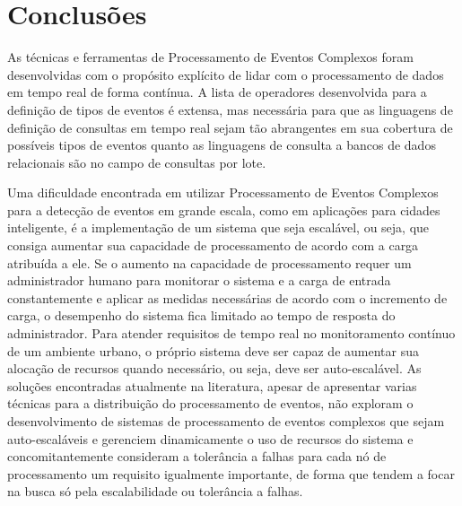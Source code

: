\chapter{Conclusões}
\label{cap:conclusoes}



As técnicas e ferramentas de Processamento de Eventos Complexos foram desenvolvidas com o propósito explícito de lidar com o processamento de dados em tempo real de forma contínua. A lista de operadores desenvolvida para a definição de tipos de eventos é extensa, mas necessária para que as linguagens de definição de consultas em tempo real sejam tão abrangentes em sua cobertura de possíveis tipos de eventos quanto as linguagens de consulta a bancos de dados relacionais são no campo de consultas por lote.

Uma dificuldade encontrada em utilizar Processamento de Eventos Complexos para a detecção de eventos em grande escala, como em aplicações para cidades inteligente, é a implementação de um sistema que seja escalável, ou seja, que consiga aumentar sua capacidade de processamento de acordo com a carga atribuída a ele. Se o aumento na capacidade de processamento requer um administrador humano para monitorar o sistema e a carga de entrada constantemente e aplicar as medidas necessárias de acordo com o incremento de carga, o desempenho do sistema fica limitado ao tempo de resposta do administrador. Para atender requisitos de tempo real no monitoramento contínuo de um ambiente urbano, o próprio sistema deve ser capaz de aumentar sua alocação de recursos quando necessário, ou seja, deve ser auto-escalável. As soluções encontradas atualmente na literatura, apesar de apresentar varias técnicas para a distribuição do processamento de eventos, não exploram o desenvolvimento de sistemas de processamento de eventos complexos que sejam auto-escaláveis e gerenciem dinamicamente o uso de recursos do sistema e concomitantemente consideram a tolerância a falhas para cada nó de processamento um requisito igualmente importante, de forma que tendem a focar na busca só pela escalabilidade ou tolerância a falhas.


